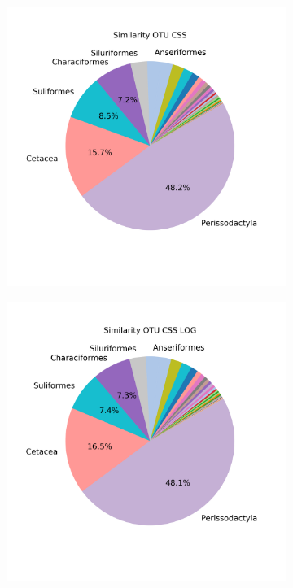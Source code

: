 \begin{figure}[!h]
	\centering

	\begin{subfigure}{0.45\textwidth}
	\includegraphics[width=\textwidth]{rfr_sim_mean_pieOTU CSS}
	\caption{}
	\label{fig:simmeanotucss}
	\end{subfigure}	
	\begin{subfigure}{0.45\textwidth}
		\includegraphics[width=\textwidth]{rfr_sim_mean_pieOTU CSS LOG}

\end{subfigure}
\end{figure}
